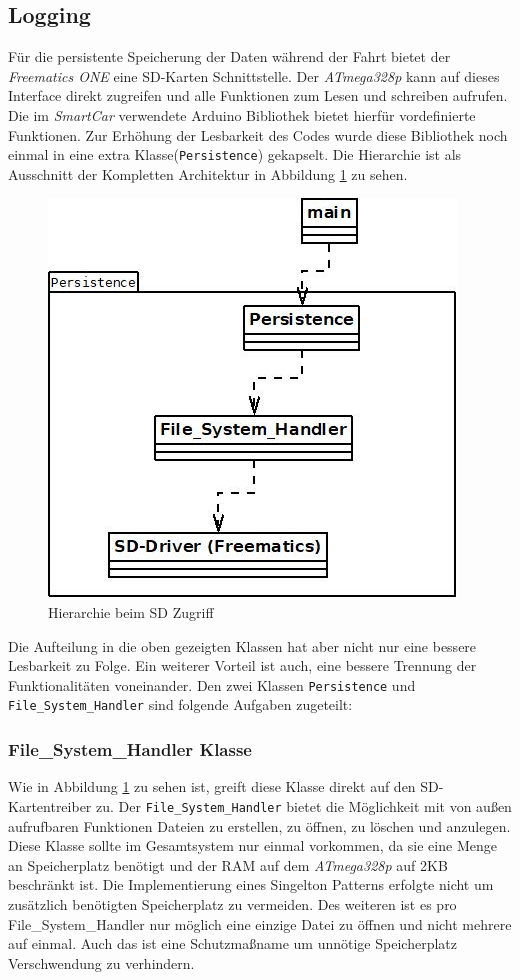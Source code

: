 \subsection{Logging}
\label{sec:Logging}
Für die persistente Speicherung der Daten während der Fahrt bietet der \textit{Freematics ONE} eine SD-Karten Schnittstelle. Der \textit{ATmega328p} kann auf dieses Interface direkt zugreifen und alle Funktionen zum Lesen und schreiben aufrufen. Die im \textit{SmartCar} verwendete Arduino Bibliothek bietet hierfür vordefinierte Funktionen. Zur Erhöhung der Lesbarkeit des Codes wurde diese Bibliothek noch einmal in eine extra Klasse(\texttt{Persistence}) gekapselt. Die Hierarchie ist als Ausschnitt der Kompletten Architektur in Abbildung \ref{fig:Persistence} zu sehen. 
\begin{figure}[h]
  \begin{center}
    \includegraphics[scale=0.75]{./img/Persistence.jpg}
    \caption{Hierarchie beim SD Zugriff}
    \label{fig:Persistence}
  \end{center}
\end{figure}
Die Aufteilung in die oben gezeigten Klassen hat aber nicht nur eine bessere Lesbarkeit zu Folge. Ein weiterer Vorteil ist auch, eine bessere Trennung der Funktionalitäten voneinander. Den zwei Klassen \texttt{Persistence} und \texttt{File\_System\_Handler} sind folgende Aufgaben zugeteilt:\pagebreak
\subsubsection*{File\_System\_Handler Klasse}
Wie in Abbildung \ref{fig:Persistence} zu sehen ist, greift diese Klasse direkt auf den SD-Kartentreiber zu. Der \texttt{File\_System\_Handler} bietet die Möglichkeit mit von außen aufrufbaren Funktionen Dateien zu erstellen, zu öffnen, zu löschen und anzulegen. Diese Klasse sollte im Gesamtsystem nur einmal vorkommen, da sie eine Menge an Speicherplatz benötigt und der RAM auf dem \textit{ATmega328p} auf 2KB beschränkt ist.\cite{Atmega328P} Die Implementierung eines Singelton Patterns erfolgte nicht um zusätzlich benötigten Speicherplatz zu vermeiden.
Des weiteren ist es pro File\_System\_Handler nur möglich eine einzige Datei zu öffnen und nicht mehrere auf einmal. Auch das ist eine Schutzmaßname um unnötige Speicherplatz Verschwendung zu verhindern.
